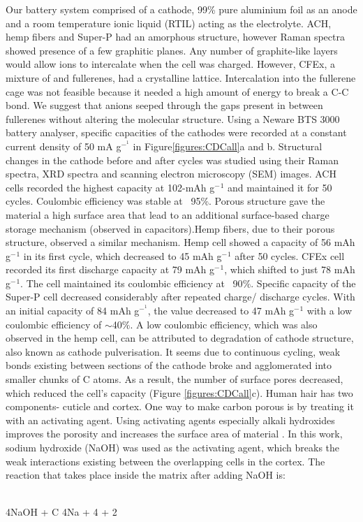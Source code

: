 \documentclass{article}
\begin{document}
Our battery system comprised of a cathode, 99\% pure aluminium foil as an anode and a room temperature ionic liquid (RTIL) acting as the electrolyte. ACH, hemp fibers and Super-P had an amorphous structure, however Raman spectra showed presence of a few graphitic planes. Any number of graphite-like layers would allow  ions to intercalate when the cell was charged. However, CFEx, a mixture of  and  fullerenes, had a crystalline lattice. Intercalation into the fullerene cage was not feasible because it needed a high amount of energy to break a C-C bond. We suggest that  anions seeped through the gaps present in between fullerenes without altering the molecular structure. Using a Neware BTS 3000 battery analyser, specific capacities of the cathodes were recorded at a constant current density of 50 mA g$^-^1$ in Figure\ref{figures:CDCall}a and b. Structural changes in the cathode before and after cycles was studied using their Raman spectra, XRD spectra and scanning electron microscopy (SEM) images.
ACH cells recorded the highest capacity at 102-mAh g$^-{^1}$ and maintained it for 50 cycles. Coulombic efficiency was stable at ~95$\%$. Porous structure gave the material a high surface area that lead to an additional surface-based charge storage mechanism (observed in capacitors).Hemp fibers, due to their porous structure, observed a similar mechanism. Hemp cell showed a capacity of 56 mAh g$^-{^1}$ in its first cycle, which decreased to 45 mAh g$^-{^1}$ after 50 cycles. 
CFEx cell recorded its first discharge capacity at 79 mAh g$^-{^1}$, which shifted to just 78 mAh g$^-{^1}$. The cell maintained its coulombic efficiency at ~90$\%$. 
Specific capacity of the Super-P cell decreased considerably after repeated charge/ discharge cycles. With an initial capacity of 84 mAh g$^-^1$, the value decreased to 47 mAh g$^-{^1}$ with a low coulombic efficiency of $\sim$40$\%$. 
A low coulombic efficiency, which was also observed in the hemp cell, can be attributed to degradation of cathode structure, also known as cathode pulverisation. It seems due to continuous cycling, weak bonds existing between sections of the cathode broke and agglomerated into smaller chunks of C atoms. As a result, the number of surface pores decreased, which reduced the cell's capacity (Figure \ref{figures:CDCall}c). 
Human hair has two components- cuticle and cortex. One way to make carbon porous is by treating it with an activating agent. Using activating agents especially alkali hydroxides improves the porosity and increases the surface area of material \cite{liu_hair-based_2017} .
In this work, sodium hydroxide (NaOH) was used as the activating agent, which breaks the weak interactions existing between the overlapping cells in the cortex. The reaction that takes place inside the matrix after adding NaOH is:
\begin{center}
    \\4NaOH + C \longrightarrow 4Na + 4 + 2 \cite{qian_human_2013}
\end{center}
\end{document}
